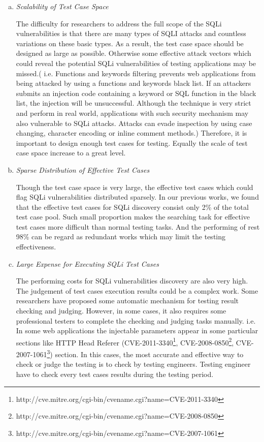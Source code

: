 \documentclass{sig-alternate}
\begin{document}
\begin{enumerate}[a)]
\item \emph{Scalability of Test Case Space}

The difficulty for researchers to address the full scope of the SQLi vulnerabilities is that there are many types of SQLI attacks and countless variations on these basic types. As a result, the test case space should be designed as large as possible. Otherwise some effective attack vectors which could reveal the potential SQLi vulnerabilities of testing applications may be missed.( i.e. Functions and keywords filtering prevents web applications from being attacked by using a functions and keywords black list. If an attackers submits an injection code containing a keyword or SQL function in the black list, the injection will be unsuccessful. Although the technique is very strict and perform in real world, applications with such security mechanism may also vulnerable to SQLi attacks. Attacks can evade inspection by using case changing, character encoding or inline comment methods.) Therefore, it is important to design enough test cases for testing. Equally the scale of test case space increase to a great level.
\item \emph{Sparse Distribution of Effective Test Cases}

Though the test case space is very large, the effective test cases which could flag SQLi vulnerabilities distributed sparsely. In our previous works, we found that the effective test cases for SQLi discovery consist only 2\% of the total test case pool. Such small proportion makes the searching task for effective test cases more difficult than normal testing tasks. And the performing of rest 98\% can be regard as redundant works which may limit the testing effectiveness. 
\item \emph{Large Expense for Executing SQLi Test Cases}

The performing costs for SQLi vulnerabilities discovery are also very high. The judgement of test cases execution results could be a complex work. Some researchers have proposed some automatic mechanism for testing result checking and judging\cite{appelt2014automated, damele2012sqlmap, riancho2011w3af}. However, in some cases, it also requires some professional testers to complete the checking and judging tasks manually. i.e. In some web applications the injectable parameters appear in some particular sections like HTTP Head Referer (CVE-2011-3340\footnote{http://cve.mitre.org/cgi-bin/cvename.cgi?name=CVE-2011-3340}, CVE-2008-0850\footnote{http://cve.mitre.org/cgi-bin/cvename.cgi?name=CVE-2008-0850}, CVE-2007-1061\footnote{http://cve.mitre.org/cgi-bin/cvename.cgi?name=CVE-2007-1061}) section. In this cases, the most accurate and effective way to check or judge the testing is to check by testing engineers. Testing engineer have to check every test cases results during the testing period. 
\end{enumerate}
\end{document}
